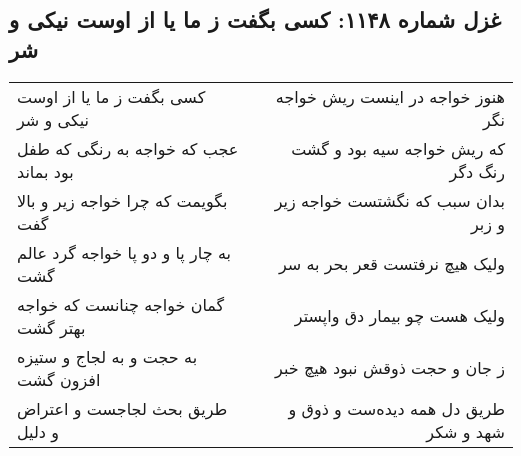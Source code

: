 \begin{center}
\section*{غزل شماره ۱۱۴۸: کسی بگفت ز ما یا از اوست نیکی و شر}
\label{sec:1148}
\begin{longtable}{l p{0.5cm} r}
کسی بگفت ز ما یا از اوست نیکی و شر
&&
هنوز خواجه در اینست ریش خواجه نگر
\\
عجب که خواجه به رنگی که طفل بود بماند
&&
که ریش خواجه سیه بود و گشت رنگ دگر
\\
بگویمت که چرا خواجه زیر و بالا گفت
&&
بدان سبب که نگشتست خواجه زیر و زبر
\\
به چار پا و دو پا خواجه گرد عالم گشت
&&
ولیک هیچ نرفتست قعر بحر به سر
\\
گمان خواجه چنانست که خواجه بهتر گشت
&&
ولیک هست چو بیمار دق واپستر
\\
به حجت و به لجاج و ستیزه افزون گشت
&&
ز جان و حجت ذوقش نبود هیچ خبر
\\
طریق بحث لجاجست و اعتراض و دلیل
&&
طریق دل همه دیده‌ست و ذوق و شهد و شکر
\\
\end{longtable}
\end{center}
